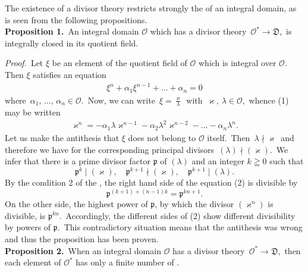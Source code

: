 \documentclass[12pt]{article}
\theoremstyle{definition}
\begin{document}

The existence of a divisor theory restricts strongly the  of an integral domain, as is seen from the following propositions.\\

\textbf{Proposition 1.}\, An integral domain $\mathcal{O}$ which has a divisor theory \,$\mathcal{O}^*\to\mathfrak{D}$,\, is integrally closed in its quotient field.

{\em Proof.}\, Let $\xi$ be an element of the quotient field of $\mathcal{O}$ which is integral over $\mathcal{O}$.\, Then $\xi$ satisfies an equation
\begin{align}
\xi^n+\alpha_1\xi^{n-1}+\ldots+\alpha_n = 0
\end{align}
where\, $\alpha_1,\,\ldots,\,\alpha_n \in \mathcal{O}$.\, Now, we can write\, 
$\displaystyle\xi = \frac{\varkappa}{\lambda}$\, with\, $\varkappa,\,\lambda \in \mathcal{O}$,\, whence (1) may be written
\begin{align}
\varkappa^n = -\alpha_1\lambda\varkappa^{n-1}-\alpha_2\lambda^2\varkappa^{n-2}-\ldots-\alpha_n\lambda^n.
\end{align}
Let us make the antithesis that $\xi$ does not belong to $\mathcal{O}$ itself.\, Then\, $\lambda \nmid \varkappa$\, and therefore we have for the corresponding principal divisors \,$(\lambda) \nmid (\varkappa)$.\, We infer that there is a prime divisor factor $\mathfrak{p}$ of $(\lambda)$ and an integer $k \geqq 0$ such that 
$$\mathfrak{p}^k \mid (\varkappa),\quad \mathfrak{p}^{k+1} \nmid (\varkappa),\quad \mathfrak{p}^{k+1} \mid (\lambda).$$
By the condition 2 of the , the right hand side of the equation (2) is divisible by
$$\mathfrak{p}^{(k+1)+(n-1)k} = \mathfrak{p}^{kn+1}.$$
On the other side, the highest power of $\mathfrak{p}$, by which the divisor $(\varkappa^n)$ is divisible, is $\mathfrak{p}^{kn}$.\, Accordingly, the different sides of (2) show different divisibility by powers of $\mathfrak{p}$.\, This contradictory situation means that the antithesis was wrong and thus the proposition has been proven.\\

\textbf{Proposition 2.}\, When an integral domain $\mathcal{O}$ has a divisor theory \,$\mathcal{O}^*\to\mathfrak{D}$,\, then each element of $\mathcal{O}^*$ has only a finite number of  .
\end{document}
